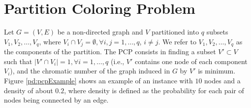 \section{Partition Coloring Problem}





Let $G = (V, E)$ be a non-directed graph and $V$ partitioned into $q$ subsets $V_1, V_2,\ldots, V_q$, where $V_i \cap V_j = \emptyset, \forall i, j = 1, \ldots , q$, $i \neq j$. We refer to $V_1, V_2, \ldots , V_q$ as the components of the partition. The PCP consists in finding a subset $V' \subset V$ such that $|V' \cap V_i| = 1, \forall i = 1, \ldots , q$ (i.e., $V'$ contains one node of each component $V_i$), and the chromatic number of the graph induced in $G$ by $V'$ is minimum.\\
Figure \ref{pd:pcpExample} shows an example of an instance with $10$ nodes and a density of about $0.2$, where density is defined as the probability for each pair of nodes being connected by an edge.

